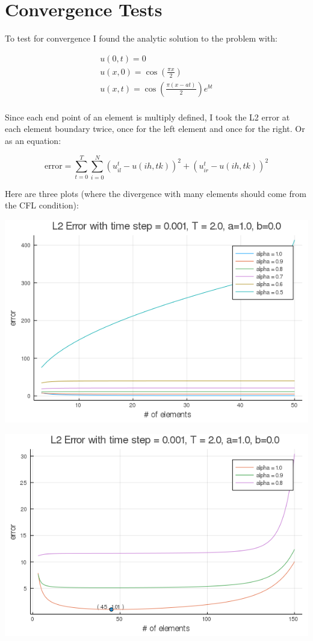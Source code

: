 \documentclass{article}
\begin{document}
\section{Convergence Tests}

To test for convergence I found the analytic solution to the problem with:

\begin{gather*}
  u(0, t) = 0 \\
  u(x, 0) = \cos\left(\frac{\pi x}{2}\right) \\
  u(x,t) = \cos\left(\frac{\pi(x - at)}{2}\right)e^{bt}\\
\end{gather*}

\noindent Since each end point of an element is multiply defined, I took the L2 error at each element boundary twice, once for the left element and once for the right. Or as an equation:

$$\text{error} = \sum_{t=0}^T\sum_{i=0}^N (u_{il}^t - u(ih, tk))^2 + (u_{ir}^t - u(ih, tk))^2$$

Here are three plots (where the divergence with many elements should come from the CFL condition):

\includegraphics[scale=.5]{compare_alpha.png}

\includegraphics[scale=.5]{upwind_with_best_no_lambda.png}
\end{document}
